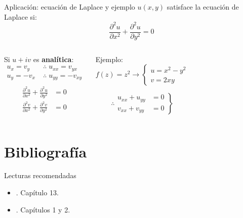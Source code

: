 \documentclass[9pt, aspectratio=169]{beamer}
\begin{document}
\begin{frame}{Aplicación: ecuación de Laplace y ejemplo}
$u(x, y)$ satisface la ecuación de Laplace si: 
\[\boxed{ \frac{\partial^2 u}{\partial x^2} + \frac{\partial^2 u}{\partial y^2} = 0 } \] \pause
\vspace{1em}

\begin{columns}[t]
 \cx
 Si $u + i v$ es \textbf{analítica}:
 \begin{align*}
  u_x = v_y \; &\therefore \; u_{xx} = v_{yx} \\
  u_y = -v_x \; &\therefore \; u_{yy} = -v_{xy} \\
 \end{align*} \vspace{-3em}
 \begin{align*}
  \frac{\partial^2 u}{\partial x^2} + \frac{\partial^2 u}{\partial y^2} &= 0 \\
  \frac{\partial^2 v}{\partial x^2} + \frac{\partial^2 v}{\partial y^2} &= 0
 \end{align*} \pause

 \cx
 \begin{exampleblock}{Ejemplo:}
 \[ f(z) = z^2 \longrightarrow 
 \begin{cases}
  u = x^2 - y^2 \\
  v = 2 x y
 \end{cases}
\]

\[
\therefore \left. { \begin{array}{ll}
                   u_{xx} + u_{yy} &= 0 \\
                   v_{xx} + v_{yy} &= 0 
                  \end{array} }
            \right\}
\]
 \end{exampleblock}
\end{columns}
\end{frame}


\section*{Bibliografía}
\begin{frame}[allowframebreaks]{Lecturas recomendadas}
\begin{itemize}
 \item {}. Capítulo 13.
 \item {}. Capítulos 1 y 2.
\end{itemize}

\end{frame}
\end{document}
